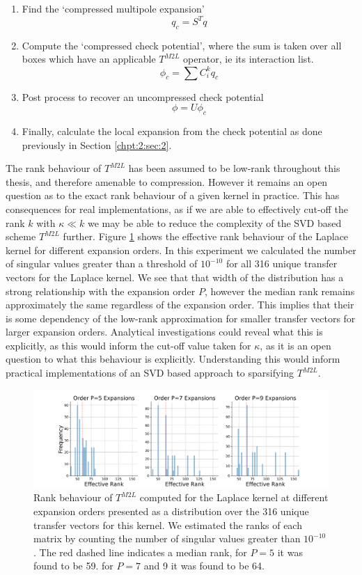 \begin{enumerate}
    \item Find the `compressed multipole expansion'
    \[
    q_c = S^T q
    \]
    \item Compute the `compressed check potential', where the sum is taken over all boxes which have an applicable $T^{M2L}$ operator, ie its interaction list.
    \[
    \phi_c = \sum C^k_i q_c
    \]
    \item Post process to recover an uncompressed check potential
    \[
    \phi = U \phi_c
    \]
    \item Finally, calculate the local expansion from the check potential as done previously in Section \ref{chpt:2:sec:2}.
\end{enumerate}


The rank behaviour of $T^{M2L}$ has been assumed to be low-rank throughout this thesis, and therefore amenable to compression. However it remains an open question as to the exact rank behaviour of a given kernel in practice. This has consequences for real implementations, as if we are able to effectively cut-off the rank $k$ with $\kappa \ll k$ we may be able to reduce the complexity of the SVD based scheme $T^{M2L}$ further. Figure \ref{fig:chpt:3:sec:1:subsec:1:rank_experiment} shows the effective rank behaviour of the Laplace kernel for different expansion orders. In this experiment we calculated the number of singular values greater than a threshold of $10^{-10}$ for all 316 unique transfer vectors for the Laplace kernel. We see that that width of the distribution has a strong relationship with the expansion order $P$, however the median rank remains approximately the same regardless of the expansion order. This implies that their is some dependency of the low-rank approximation for smaller transfer vectors for larger expansion orders. Analytical investigations could reveal what this is explicitly, as this would inform the cut-off value taken for $\kappa$, as it is an open question to what this behaviour is explicitly. Understanding this would inform practical implementations of an SVD based approach to sparsifying $T^{M2L}$.

\begin{figure}
    \centering
    \includegraphics[width=\textwidth]{images/ch_3/rank_histogram.png}
    \caption{Rank behaviour of $T^{M2L}$ computed for the Laplace kernel at different expansion orders presented as a distribution over the 316 unique transfer vectors for this kernel. We estimated the ranks of each matrix by counting the number of singular values greater than $10^{-10}$. The red dashed line indicates a median rank, for $P=5$ it was found to be 59. for $P=7$ and 9 it was found to be 64.}
    \label{fig:chpt:3:sec:1:subsec:1:rank_experiment}
\end{figure}

